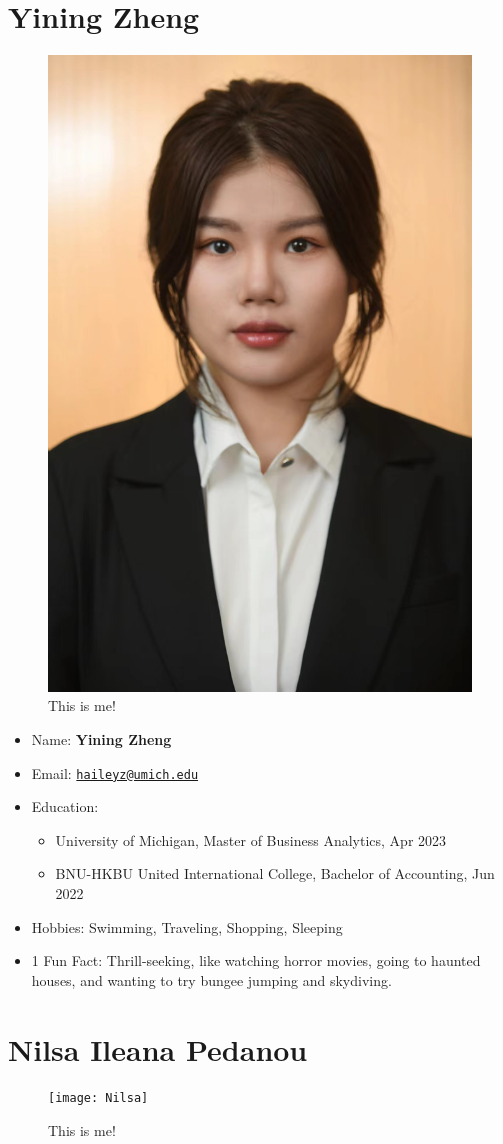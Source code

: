 \documentclass[
]{book}
\begin{document}
\hypertarget{yining-zheng}{%
\section{Yining Zheng}\label{yining-zheng}}

\begin{figure}
\includegraphics[width=0.2\linewidth,height=0.2\textheight]{Yining} \caption{This is me!}\label{fig:unnamed-chunk-5}
\end{figure}

\begin{itemize}
\item
  Name: \textbf{Yining Zheng}
\item
  Email: \href{mailto:haileyz@umich.edu}{\nolinkurl{haileyz@umich.edu}}
\item
  Education:

  \begin{itemize}
  \item
    University of Michigan, Master of Business Analytics, Apr 2023
  \item
    BNU-HKBU United International College, Bachelor of Accounting, Jun 2022
  \end{itemize}
\item
  Hobbies: Swimming, Traveling, Shopping, Sleeping
\item
  1 Fun Fact: Thrill-seeking, like watching horror movies, going to haunted houses, and wanting to try bungee jumping and skydiving.
\end{itemize}

\hypertarget{nilsa-ileana-pedanou}{%
\section{Nilsa Ileana Pedanou}\label{nilsa-ileana-pedanou}}

\begin{figure}
\texttt{[image: Nilsa]} \caption{This is me!}\label{fig:unnamed-chunk-6}
\end{figure}
\end{document}
